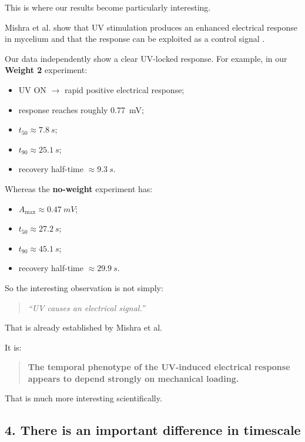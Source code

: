 \documentclass[11pt,a4paper]{article}
\begin{document}
This is where our results become particularly interesting.

Mishra et al. show that UV stimulation produces an enhanced electrical
response in mycelium and that the response can be exploited as a control
signal \cite{Mishra2024}.

Our data independently show a clear UV-locked response. For example, in our
\textbf{Weight 2} experiment:

\begin{itemize}
    \item UV ON $\rightarrow$ rapid positive electrical response;
    \item response reaches roughly \SI{0.77}{mV};
    \item $t_{50}\approx\SI{7.8}{s}$;
    \item $t_{90}\approx\SI{25.1}{s}$;
    \item recovery half-time $\approx\SI{9.3}{s}$.
\end{itemize}

Whereas the \textbf{no-weight} experiment has:

\begin{itemize}
    \item $A_{\max}\approx\SI{0.47}{mV}$;
    \item $t_{50}\approx\SI{27.2}{s}$;
    \item $t_{90}\approx\SI{45.1}{s}$;
    \item recovery half-time $\approx\SI{29.9}{s}$.
\end{itemize}

So the interesting observation is not simply:

\begin{quote}
\emph{``UV causes an electrical signal.''}
\end{quote}

That is already established by Mishra et al.

It is:

\begin{quote}
\textbf{The temporal phenotype of the UV-induced electrical response appears
to depend strongly on mechanical loading.}
\end{quote}

That is much more interesting scientifically.

\subsection{4. There is an important difference in timescale}
\end{document}
